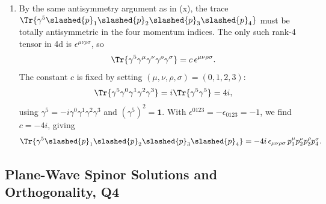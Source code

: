 \begin{solution}
\begin{enumerate}[label=\roman*.]
    \item By the same antisymmetry argument as in (x), the trace $\Tr{\gamma^5\slashed{p}_1\slashed{p}_2\slashed{p}_3\slashed{p}_4}$ must be totally antisymmetric in the four momentum indices. The only such rank-4 tensor in 4d is $\epsilon^{\mu\nu\rho\sigma}$, so
    \begin{equation}
        \Tr{\gamma^5\gamma^\mu\gamma^\nu\gamma^\rho\gamma^\sigma} = c\,\epsilon^{\mu\nu\rho\sigma}.
    \end{equation}
    The constant $c$ is fixed by setting $(\mu,\nu,\rho,\sigma) = (0,1,2,3)$:
    \begin{equation}
        \Tr{\gamma^5\gamma^0\gamma^1\gamma^2\gamma^3} = i\Tr{\gamma^5\gamma^5} = 4i,
    \end{equation}
    using $\gamma^5 = -i\gamma^0\gamma^1\gamma^2\gamma^3$ and $(\gamma^5)^2 = \mathbf{1}$. With $\epsilon^{0123} = -\epsilon_{0123} = -1$, we find $c = -4i$, giving
    \begin{equation}
        \Tr{\gamma^5\slashed{p}_1\slashed{p}_2\slashed{p}_3\slashed{p}_4} = -4i\,\epsilon_{\mu\nu\rho\sigma}\,p_1^\mu p_2^\nu p_3^\rho p_4^\sigma.
    \end{equation}
    \end{enumerate}
\end{solution}

\subsection{Plane-Wave Spinor Solutions and Orthogonality, Q4}

